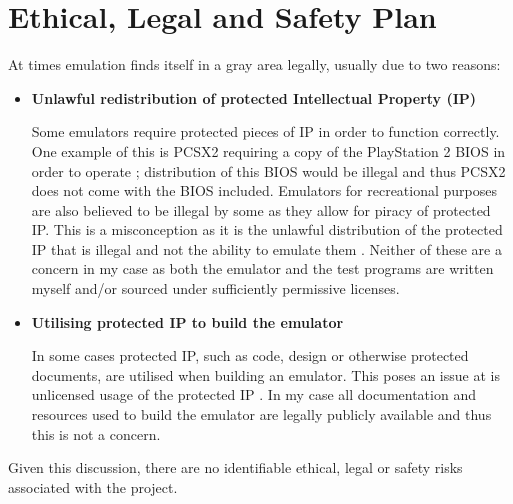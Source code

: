 \section{Ethical, Legal and Safety Plan}

At times emulation finds itself in a gray area legally, usually due to two reasons:

\begin{itemize}
    \item \textbf{Unlawful redistribution of protected Intellectual Property (IP)} %
    
    Some emulators require protected pieces of IP in order to function correctly. One example of this is PCSX2 requiring a copy of the PlayStation 2 BIOS in order to operate \cite{PCSX2-getting-started}; distribution of this BIOS would be illegal and thus PCSX2 does not come with the BIOS included. Emulators for recreational purposes are also believed to be illegal by some as they allow for piracy of protected IP. This is a misconception as it is the unlawful distribution of the protected IP that is illegal and not the ability to emulate them \cite{nintendo-court-case, sega-court-case, sony-court-case}. Neither of these are a concern in my case as both the emulator and the test programs are written myself and/or sourced under sufficiently permissive licenses.

    \item \textbf{Utilising protected IP to build the emulator} %
    
    In some cases protected IP, such as code, design or otherwise protected documents, are utilised when building an emulator. This poses an issue at is unlicensed usage of the protected IP \cite{nintendo-source-leak}. In my case all documentation and resources used to build the emulator are legally publicly available and thus this is not a concern.
\end{itemize}

Given this discussion, there are no identifiable ethical, legal or safety risks associated with the project.